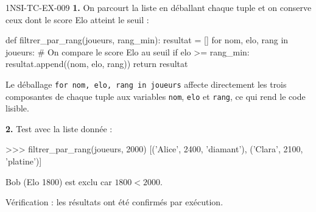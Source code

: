 \begin{corrige}{1NSI-TC-EX-009}
\textbf{1.} On parcourt la liste en déballant chaque tuple et on conserve ceux dont le score Elo atteint le seuil :

\begin{python}
def filtrer_par_rang(joueurs, rang_min):
    resultat = []
    for nom, elo, rang in joueurs:
        # On compare le score Elo au seuil
        if elo >= rang_min:
            resultat.append((nom, elo, rang))
    return resultat
\end{python}

Le déballage \lstinline{for nom, elo, rang in joueurs} affecte directement les trois composantes de chaque tuple aux variables \lstinline{nom}, \lstinline{elo} et \lstinline{rang}, ce qui rend le code lisible.

\textbf{2.} Test avec la liste donnée :
\begin{console}
>>> filtrer_par_rang(joueurs, 2000)
[('Alice', 2400, 'diamant'), ('Clara', 2100, 'platine')]
\end{console}

Bob (Elo 1800) est exclu car $1800 < 2000$.

Vérification : les résultats ont été confirmés par exécution.
\end{corrige}
